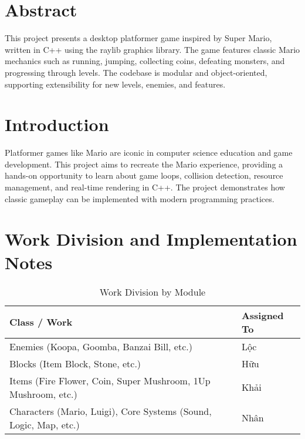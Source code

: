 
\clearpage
\begin{flushleft}
\section*{Abstract}
This project presents a desktop platformer game inspired by Super Mario, written in C++ using the raylib graphics library. The game features classic Mario mechanics such as running, jumping, collecting coins, defeating monsters, and progressing through levels. The codebase is modular and object-oriented, supporting extensibility for new levels, enemies, and features.

\section{Introduction}
Platformer games like Mario are iconic in computer science education and game development. This project aims to recreate the Mario experience, providing a hands-on opportunity to learn about game loops, collision detection, resource management, and real-time rendering in C++. The project demonstrates how classic gameplay can be implemented with modern programming practices.

\section{Work Division and Implementation Notes}

\begin{table}[H]
\centering
\begin{tabular}{|l|l|}
\hline
\textbf{Class / Work} & \textbf{Assigned To} \\
\hline
Enemies (Koopa, Goomba, Banzai Bill, etc.) & Lộc \\
\hline
Blocks (Item Block, Stone, etc.) & Hữu \\
\hline
Items (Fire Flower, Coin, Super Mushroom, 1Up Mushroom, etc.) & Khải \\
\hline
Characters (Mario, Luigi), Core Systems (Sound, Logic, Map, etc.)  & Nhân \\
\hline
\end{tabular}
\caption{Work Division by Module}
\end{table}

\vspace{1em}


\end{flushleft}
